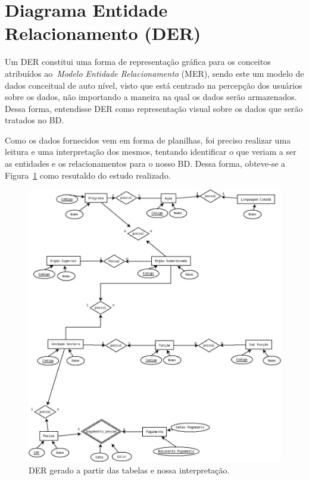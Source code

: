 \documentclass [12pt]{article}
\begin{document}
	\section{Diagrama Entidade Relacionamento (DER)}
		\label{sec:DER}
	Um DER constitui uma forma de representação gráfica para os conceitos atribuídos ao~\emph{Modelo Entidade Relacionamento} (MER), sendo este um modelo de dados conceitual de auto nível, visto que está centrado na percepção dos usuários sobre os dados, não importando a maneira na qual os dados serão armazenados. Dessa forma, entendisse DER como representação visual sobre os dados que serão tratados no BD.
		
	Como os dados fornecidos vem em forma de planilhas, foi preciso realizar uma leitura e uma interpretação dos mesmos, tentando identificar o que veriam a ser as entidades e os relacionamentos para o nosso BD. Dessa forma, obteve-se a Figura~\ref{fig:DERgerado} como resutaldo do estudo realizado.
	
	\begin{figure}[h]
		\centering
		\includegraphics[width=1\textwidth]{Imagens/DER}
		\caption{DER gerado a partir das tabelas e nossa interpretação.}
		\label{fig:DERgerado}
	\end{figure}
	
\end{document}

